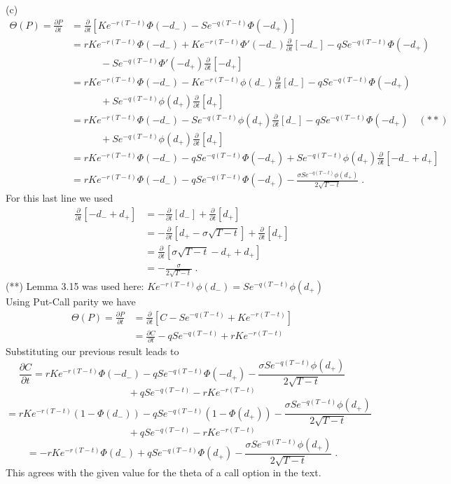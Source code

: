 \documentclass[11pt]{article}
\begin{document}
(c)
\begin{align*}
\Theta(P) = \frac{\partial P}{\partial t} & = \frac{\partial}{\partial t} [Ke^{-r(T-t)}\Phi(-d_-)-Se^{-q(T-t)}\Phi(-d_+)] \\ & = rKe^{-r(T-t)}\Phi(-d_-) + Ke^{-r(T-t)}\Phi'(-d_-)\frac{\partial}{\partial t} [-d_-] - qSe^{-q(T-t)}\Phi(-d_+) \\ & \quad\quad\quad - Se^{-q(T-t)}\Phi'(-d_+)\frac{\partial}{\partial t} [-d_+] \\
& = rKe^{-r(T-t)}\Phi(-d_-) - Ke^{-r(T-t)}\phi(d_-)\frac{\partial}{\partial t} [d_-]- qSe^{-q(T-t)}\Phi(-d_+) \\ & \quad\quad\quad + Se^{-q(T-t)}\phi(d_+)\frac{\partial}{\partial t} [d_+] \\
& = rKe^{-r(T-t)}\Phi(-d_-) - Se^{-q(T-t)}\phi(d_+)\frac{\partial}{\partial t} [d_-]- qSe^{-q(T-t)}\Phi(-d_+)\quad(**) \\ & \quad\quad\quad + Se^{-q(T-t)}\phi(d_+)\frac{\partial}{\partial t} [d_+] \\ & = rKe^{-r(T-t)}\Phi(-d_-)- qSe^{-q(T-t)}\Phi(-d_+) + Se^{-q(T-t)}\phi(d_+)\frac{\partial}{\partial t} [-d_- + d_+] \\
& = rKe^{-r(T-t)}\Phi(-d_-)- qSe^{-q(T-t)}\Phi(-d_+) - \frac{\sigma Se^{-q(T-t)}\phi(d_+)}{2\sqrt{T-t}}\;.
\end{align*}
For this last line we used
\begin{align*}
\frac{\partial}{\partial t} [-d_- + d_+] &= -\frac{\partial}{\partial t} [d_-] + \frac{\partial}{\partial t} [d_+] \\
& = -\frac{\partial}{\partial t} [d_+ - \sigma\sqrt{T-t}] + \frac{\partial}{\partial t} [d_+] \\
& = \frac{\partial}{\partial t} [\sigma\sqrt{T-t} -d_+ +d_+]\\ & = -\frac{\sigma}{2\sqrt{T-t}} \;.
\end{align*}
(**) Lemma 3.15 was used here: $Ke^{-r(T-t)} \phi(d_-) = Se^{-q(T-t)} \phi(d_+)$ \\

Using Put-Call parity we have
\begin{align*}
\Theta(P) = \frac{\partial P}{\partial t} & = \frac{\partial}{\partial t} [C-Se^{-q(T-t)} + Ke^{-r(T-t)}] \\ & = \frac{\partial C}{\partial t} - qSe^{-q(T-t)} + rKe^{-r(T-t)}
\end{align*}
Substituting our previous result leads to 
$$\frac{\partial C}{\partial t} = rKe^{-r(T-t)}\Phi(-d_-)- qSe^{-q(T-t)}\Phi(-d_+) - \frac{\sigma Se^{-q(T-t)}\phi(d_+)}{2\sqrt{T-t}} $$
$$ \quad \quad + qSe^{-q(T-t)} - rKe^{-r(T-t)} $$
$$ = rKe^{-r(T-t)}(1-\Phi(d_-))- qSe^{-q(T-t)}(1-\Phi(d_+)) - \frac{\sigma Se^{-q(T-t)}\phi(d_+)}{2\sqrt{T-t}}$$
$$\quad\quad + qSe^{-q(T-t)} - rKe^{-r(T-t)}$$
$$ = -rKe^{-r(T-t)}\Phi(d_-) + qSe^{-q(T-t)}\Phi(d_+) - \frac{\sigma Se^{-q(T-t)}\phi(d_+)}{2\sqrt{T-t}} \;.$$ 
This agrees with the given value for the theta of a call option in the text.\\
\end{document}
